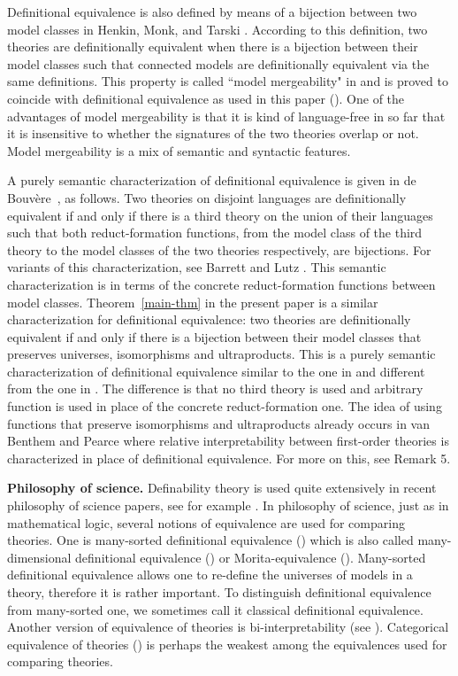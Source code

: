 \documentclass[12pt,leqno]{article}
\begin{document}
Definitional equivalence is also defined by means of a bijection
between two model classes in Henkin, Monk, and Tarski \cite[p.56]{HMT71}.
According to this definition, two theories are definitionally equivalent 
 when there is a bijection between their model classes such that connected 
 models are definitionally equivalent via the same definitions. This property is
called ``model mergeability" in \cite[Definition 13]{LSz} and is
proved to coincide with definitional equivalence as used in this
paper (\cite[Theorem 7]{LSz}). One of the advantages of
model mergeability is that it is kind of language-free in so far
that it is insensitive to whether the signatures of the two theories
overlap or not. Model mergeability is a mix of semantic and
syntactic features. 

A purely semantic characterization of definitional equivalence is given in de Bouv\`ere~\cite{Bou}, as follows. Two theories on disjoint languages are definitionally equivalent if and only if there is a third theory on the union of their languages such that both reduct-formation functions, from the model class of the third theory to the model classes of the two theories respectively, are bijections.
%
For variants of this characterization, see Barrett \cite[Corollary 2]{Bsym} and Lutz \cite[Claim 4]{Lutz}.  This semantic characterization is in terms of the concrete reduct-formation functions between model classes. Theorem~\ref{main-thm} in the present paper is a similar characterization for definitional equivalence: two theories are definitionally equivalent if and only if there is a bijection between their model classes that preserves universes, isomorphisms and ultraproducts. This is a purely semantic characterization of definitional equivalence similar to the one in \cite{HMT71} and different from the one in \cite{Bou}. The difference is that no third theory is used and arbitrary function is used in place of the concrete reduct-formation one. The idea of using functions that preserve isomorphisms and ultraproducts already occurs in van Benthem and Pearce \cite{vBP} where relative interpretability between first-order theories is characterized in place of definitional equivalence. For more on this, see Remark 5.
\bigskip
\goodbreak

{\bf Philosophy of science.} Definability theory is used quite extensively in recent philosophy of science papers, see for example \cite{BH22, Gly, Halvorson, HudetzDCE, Weatherall}. 
%
In philosophy of science, just as in mathematical logic, several notions of equivalence are used for comparing theories.  One is many-sorted definitional equivalence (\cite{AN, harnik, Mad02}) which is also called many-dimensional definitional equivalence (\cite{Hodges, Visser}) or Morita-equivalence (\cite{BH16, Halvorson}). Many-sorted definitional equivalence allows one to re-define the universes of models in a theory, therefore it is rather important. To distinguish definitional equivalence from many-sorted one, we sometimes call it classical definitional equivalence. Another version of equivalence of theories is bi-interpretability (see \cite{Hodges, Visser}). Categorical equivalence of theories (\cite{BH16, Weatherall}) is perhaps the weakest among the equivalences used for comparing theories. 
\end{document}
